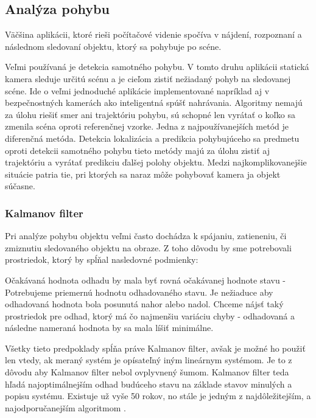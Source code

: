 \subsection{Analýza pohybu }
Väčšina aplikácii, ktoré rieši počítačové videnie spočíva v nájdení, rozpoznaní a následnom sledovaní objektu, ktorý sa pohybuje po scéne. 

Veľmi používaná je detekcia samotného pohybu. V tomto druhu aplikácii statická kamera sleduje určitú scénu a je cieľom zistiť nežiadaný pohyb na sledovanej scéne. Ide o veľmi jednoduché aplikácie implementované napríklad aj v bezpečnostných kamerách ako inteligentná spúšť nahrávania.  Algoritmy nemajú za úlohu riešiť smer ani trajektóriu pohybu, sú schopné len vyrátať o koľko sa zmenila scéna oproti referenčnej vzorke. Jedna z najpoužívanejších metód je diferenčná metóda. Detekcia lokalizácia a predikcia pohybujúceho sa predmetu oproti detekcii samotného pohybu tieto metódy majú  za úlohu zistiť aj trajektóriu a vyrátať predikciu ďalšej polohy objektu. Medzi najkomplikovanejšie situácie patria tie, pri ktorých sa naraz môže pohybovať kamera ja objekt súčasne.

\subsubsection{Kalmanov filter}
\label{sec:kalman}
Pri analýze pohybu objektu veľmi často dochádza k spájaniu, zatieneniu, či zmiznutiu sledovaného  objektu na obraze. Z toho dôvodu by sme potrebovali prostriedok, ktorý by spĺňal nasledovné podmienky: 


Očakávaná hodnota odhadu by mala byť rovná očakávanej hodnote stavu - Potrebujeme priemernú hodnotu odhadovaného stavu. Je nežiaduce aby odhadovaná hodnota bola posunutá nahor alebo nadol. 
Chceme nájsť taký prostriedok pre odhad, ktorý má čo najmenšiu variáciu chyby - odhadovaná a následne nameraná hodnota by sa mala líšiť minimálne. 



Všetky tieto predpoklady spĺňa práve Kalmanov filter, avšak je možné ho použiť len vtedy, ak  meraný systém je opísateľný iným lineárnym systémom. Je to z dôvodu aby Kalmanov filter nebol ovplyvnený šumom. Kalmanov filter teda hľadá najoptimálnejším odhad budúceho stavu na základe stavov minulých a popisu systému.  Existuje už vyše 50 rokov, no stále je jedným z najdôležitejším, a najodporučanejším algoritmom \cite{Kalman_web}.

